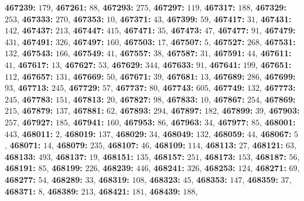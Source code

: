 \textsf{\bfseries 467239:} $179$, \textsf{\bfseries 467261:} $88$, \textsf{\bfseries 467293:} $275$, \textsf{\bfseries 467297:} $119$, \textsf{\bfseries 467317:} $188$, \textsf{\bfseries 467329:} $253$, \textsf{\bfseries 467333:} $270$, \textsf{\bfseries 467353:} $10$, \textsf{\bfseries 467371:} $43$, \textsf{\bfseries 467399:} $59$, \textsf{\bfseries 467417:} $31$, \textsf{\bfseries 467431:} $142$, \textsf{\bfseries 467437:} $213$, \textsf{\bfseries 467447:} $415$, \textsf{\bfseries 467471:} $35$, \textsf{\bfseries 467473:} $47$, \textsf{\bfseries 467477:} $91$, \textsf{\bfseries 467479:} $431$, \textsf{\bfseries 467491:} $326$, \textsf{\bfseries 467497:} $160$, \textsf{\bfseries 467503:} $17$, \textsf{\bfseries 467507:} $5$, \textsf{\bfseries 467527:} $268$, \textsf{\bfseries 467531:} $132$, \textsf{\bfseries 467543:} $166$, \textsf{\bfseries 467549:} $41$, \textsf{\bfseries 467557:} $38$, \textsf{\bfseries 467587:} $31$, \textsf{\bfseries 467591:} $44$, \textsf{\bfseries 467611:} $41$, \textsf{\bfseries 467617:} $13$, \textsf{\bfseries 467627:} $53$, \textsf{\bfseries 467629:} $344$, \textsf{\bfseries 467633:} $91$, \textsf{\bfseries 467641:} $199$, \textsf{\bfseries 467651:} $112$, \textsf{\bfseries 467657:} $131$, \textsf{\bfseries 467669:} $50$, \textsf{\bfseries 467671:} $39$, \textsf{\bfseries 467681:} $13$, \textsf{\bfseries 467689:} $286$, \textsf{\bfseries 467699:} $93$, \textsf{\bfseries 467713:} $245$, \textsf{\bfseries 467729:} $57$, \textsf{\bfseries 467737:} $80$, \textsf{\bfseries 467743:} $605$, \textsf{\bfseries 467749:} $132$, \textsf{\bfseries 467773:} $245$, \textsf{\bfseries 467783:} $151$, \textsf{\bfseries 467813:} $20$, \textsf{\bfseries 467827:} $98$, \textsf{\bfseries 467833:} $10$, \textsf{\bfseries 467867:} $254$, \textsf{\bfseries 467869:} $215$, \textsf{\bfseries 467879:} $137$, \textsf{\bfseries 467881:} $62$, \textsf{\bfseries 467893:} $294$, \textsf{\bfseries 467897:} $182$, \textsf{\bfseries 467899:} $39$, \textsf{\bfseries 467903:} $257$, \textsf{\bfseries 467927:} $185$, \textsf{\bfseries 467941:} $160$, \textsf{\bfseries 467953:} $86$, \textsf{\bfseries 467963:} $34$, \textsf{\bfseries 467977:} $85$, \textsf{\bfseries 468001:} $443$, \textsf{\bfseries 468011:} $2$, \textsf{\bfseries 468019:} $137$, \textsf{\bfseries 468029:} $34$, \textsf{\bfseries 468049:} $132$, \textsf{\bfseries 468059:} $44$, \textsf{\bfseries 468067:} $5$, \textsf{\bfseries 468071:} $14$, \textsf{\bfseries 468079:} $235$, \textsf{\bfseries 468107:} $46$, \textsf{\bfseries 468109:} $114$, \textsf{\bfseries 468113:} $27$, \textsf{\bfseries 468121:} $63$, \textsf{\bfseries 468133:} $493$, \textsf{\bfseries 468137:} $19$, \textsf{\bfseries 468151:} $135$, \textsf{\bfseries 468157:} $251$, \textsf{\bfseries 468173:} $153$, \textsf{\bfseries 468187:} $56$, \textsf{\bfseries 468191:} $85$, \textsf{\bfseries 468199:} $226$, \textsf{\bfseries 468239:} $446$, \textsf{\bfseries 468241:} $326$, \textsf{\bfseries 468253:} $124$, \textsf{\bfseries 468271:} $69$, \textsf{\bfseries 468277:} $54$, \textsf{\bfseries 468289:} $33$, \textsf{\bfseries 468319:} $108$, \textsf{\bfseries 468323:} $45$, \textsf{\bfseries 468353:} $147$, \textsf{\bfseries 468359:} $37$, \textsf{\bfseries 468371:} $8$, \textsf{\bfseries 468389:} $213$, \textsf{\bfseries 468421:} $181$, \textsf{\bfseries 468439:} $188$, 
